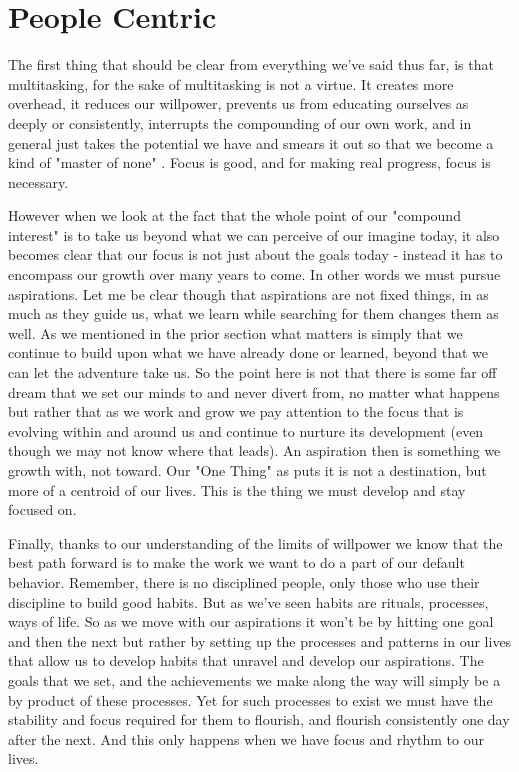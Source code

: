 \documentclass[11pt,a5paper]{book}
\begin{document}
\section{People Centric}
The first thing that should be clear from everything we've said thus far, is that multitasking, for the sake of multitasking is not a virtue. It creates more overhead, it reduces our willpower, prevents us from educating ourselves as deeply or consistently, interrupts the compounding of our own work, and in general just takes the potential we have and smears it out so that we become a kind of "master of none" \cite{keller}. Focus is good, and for making real progress, focus is necessary. 
\newline

However when we look at the fact that the whole point of our "compound interest" is to take us beyond what we can perceive of our imagine today, it also becomes clear that our focus is not just about the goals today - instead it has to encompass our growth over many years to come. In other words we must pursue aspirations. Let me be clear though that aspirations are not fixed things, in as much as they guide us, what we learn while searching for them changes them as well. As we mentioned in the prior section what matters is simply that we continue to build upon what we have already done or learned, beyond that we can let the adventure take us. So the point here is not that there is some far off dream that we set our minds to and never divert from, no matter what happens but rather that as we work and grow we pay attention to the focus that is evolving within and around us and continue to nurture its development (even though we may not know where that leads). An aspiration then is something we growth with, not toward. Our "One Thing" as \cite{keller} puts it is not a destination, but more of a centroid of our lives. This is the thing we must develop and stay focused on.
\newline

Finally, thanks to our understanding of the limits of willpower we know that the best path forward is to make the work we want to do a part of our default behavior. Remember, there is no disciplined people, only those who use their discipline to build good habits. But as we've seen habits are rituals, processes, ways of life. So as we move with our aspirations it won't be by hitting one goal and then the next but rather by setting up the processes and patterns in our lives that allow us to develop habits that unravel and develop our aspirations. The goals that we set, and the achievements we make along the way will simply be a by product of these processes. Yet for such processes to exist we must have the stability and focus required for them to flourish, and flourish consistently one day after the next. And this only happens when we have focus and rhythm to our lives. 
\newline
\end{document}
